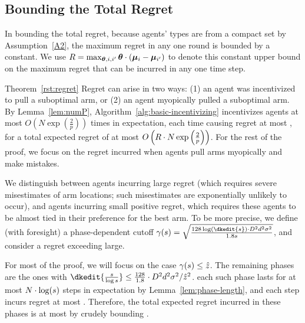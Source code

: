 \subsection{Bounding the Total Regret}
In bounding the total regret, because agents' types are from a compact
set by Assumption~\ref{A2}, the maximum regret in any one round is
bounded by a constant.
We use $R = \max_{\bm{\theta}, i,i'} \bm{\theta} \cdot (\bm{\mu}_{i} - \bm{\mu}_{i'})$
to denote this constant upper bound on the maximum regret that can be
incurred in any one time step. 


\begin{emptyextraproof}{Theorem~\ref{rst:regret}}
Regret can arise in two ways:
(1) an agent was incentivized to pull a suboptimal arm, or
(2) an agent myopically pulled a suboptimal arm.
By Lemma~\ref{lem:numP}, Algorithm~\ref{alg:basic-incentivizing}
incentivizes agents at most 
$O\left( N\exp\left(\frac{2}{p}\right) \right)$
times in expectation, each time causing regret at most \MAXR,
for a total expected regret of at most
$O\left(R\cdot N\exp\left(\frac{2}{p}\right) \right)$.
For the rest of the proof, we focus on the regret incurred when agents
pull arms myopically and make mistakes.

We distinguish between agents incurring large regret
(which requires severe misestimates of arm locations;
such misestimates are exponentially unlikely to occur), 
and agents incurring small positive regret,
which requires these agents to be almost tied in their preference for
the best arm.
To be more precise, we define (with foresight) a phase-dependent
cutoff
$\EarlyCut{s} = \sqrt{\frac{128\log(\dkedit{s}) \cdot \Diam^2 d^2 \sigma^2}{1.8 s}}$,
and consider a regret exceeding  large.

For most of the proof, we will focus on the case $\EarlyCut{s} \leq \TieCutoff$.
The remaining phases are the ones with
$\dkedit{\frac{s}{\log s}} \leq \frac{128}{1.8} \cdot \Diam^2 d^2 \sigma^2/\TieCutoff^2$.
each such phase lasts for at most $N \cdot \log(s)$ steps
in expectation by Lemma~\ref{lem:phase-length},
and each step incurs regret at most \MAXR.
Therefore, the total expected regret incurred in these phases is at most
by crudely bounding .


\end{emptyextraproof}
